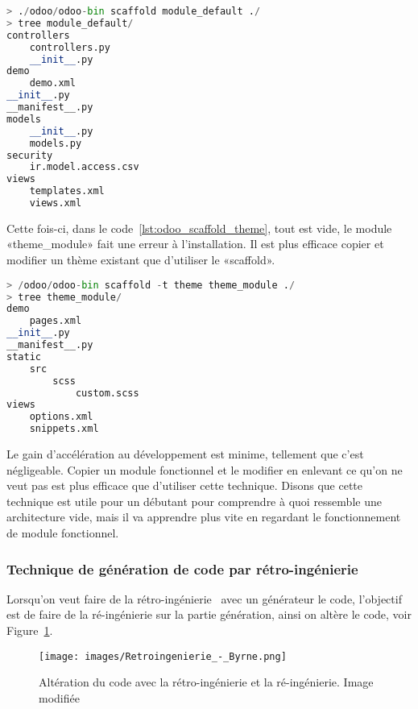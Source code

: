 \begin{lstlisting}[language=Python, upquote=true, caption={Commande Odoo pour générer un module avec le Scaffold}, label={lst:odoo_scaffold_default}]
> ./odoo/odoo-bin scaffold module_default ./
> tree module_default/
controllers
    controllers.py
    __init__.py
demo
    demo.xml
__init__.py
__manifest__.py
models
    __init__.py
    models.py
security
    ir.model.access.csv
views
    templates.xml
	views.xml
\end{lstlisting}

Cette fois-ci, dans le code~\ref{lst:odoo_scaffold_theme}, tout est vide, le module «theme\_module» fait une erreur à l'installation. Il est plus efficace copier et modifier un thème existant que d'utiliser le «scaffold».

\begin{lstlisting}[language=Python, upquote=true, caption={Commande Odoo pour générer un thème avec le Scaffold}, label={lst:odoo_scaffold_theme}]
> /odoo/odoo-bin scaffold -t theme theme_module ./
> tree theme_module/
demo
    pages.xml
__init__.py
__manifest__.py
static
    src
        scss
            custom.scss
views
    options.xml
    snippets.xml
\end{lstlisting}

Le gain d’accélération au développement est minime, tellement que c’est négligeable. Copier un module fonctionnel et le modifier en enlevant ce qu’on ne veut pas est plus efficace que d’utiliser cette technique. Disons que cette technique est utile pour un débutant pour comprendre à quoi ressemble une architecture vide, mais il va apprendre plus vite en regardant le fonctionnement de module fonctionnel.

\subsubsection{Technique de génération de code par rétro-ingénierie}

Lorsqu'on veut faire de la rétro-ingénierie~\cite{wikipedia_retroingenierie} avec un générateur le code, l'objectif est de faire de la ré-ingénierie sur la partie génération, ainsi on altère le code, voir Figure~\ref{fig:retro_re_ing}.

\begin{figure}[htb]
\centering
\texttt{[image: images/Retroingenierie\_-\_Byrne.png]}
\caption{Altération du code avec la rétro-ingénierie et la ré-ingénierie. Image modifiée~\cite{wikipedia_image_retroingenierie}}
\label{fig:retro_re_ing}
\end{figure}

